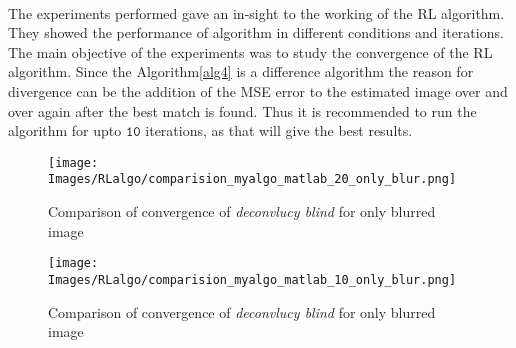 \documentclass[a4paper]{book}
\begin{document}
\paragraph*{} The experiments performed gave an in-sight to the working of the RL algorithm. They showed the performance of algorithm in different conditions and iterations. The main objective of the experiments was to study the convergence of the RL algorithm. Since the Algorithm\ref{alg4} is a difference algorithm the reason for divergence can be the addition of the MSE error to the estimated image over and over again after the best match is found. Thus it is recommended to run the algorithm for upto $ \mathtt{10} $ iterations, as that will give the best results.
\begin{figure}[H]
	\centering
	\begin{minipage}{0.45\textwidth}
		\centering
		\texttt{[image: Images/RLalgo/comparision\_myalgo\_matlab\_20\_only\_blur.png]}
		\caption[Comparison of RL convergence on blurred image ]{Comparison of convergence of \textit{deconvlucy blind} for only blurred image}
		\label{convcomp20blur}
	\end{minipage}\hfill
	\begin{minipage}{0.45\textwidth}
		\centering
		\texttt{[image: Images/RLalgo/comparision\_myalgo\_matlab\_10\_only\_blur.png]}
		\caption[Comparison of RL convergence on blurred image]{Comparison of convergence of \textit{deconvlucy blind} for only blurred image}
		\label{convcomp10blur}
	\end{minipage}
\end{figure}



\end{document}
